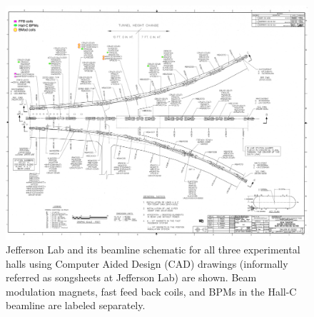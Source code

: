 \begin{singlespace}
\begin{figure}[!h]
	\begin{center}
	\includegraphics[width=15.0cm]{figures/beamline_songsheet}
	\end{center}
	\caption
	{Jefferson Lab and its beamline schematic for all three experimental halls using Computer Aided Design (CAD) drawings (informally referred as songsheets at Jefferson Lab) are shown. Beam modulation magnets, fast feed back coils, and BPMs in the Hall-C beamline are labeled separately.}
	\label{fig:beamline_songsheet}
\end{figure}
\end{singlespace}

